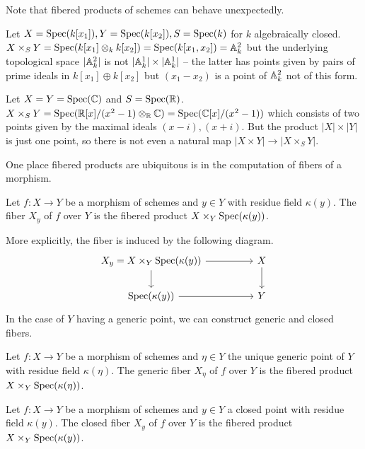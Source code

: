 Note that fibered products of schemes can behave unexpectedly. 
\begin{example}
    Let $X=\operatorname{Spec}(k[x_{1}]),Y=\operatorname{Spec}(k[x_{2}]),S=\operatorname{Spec}(k)$ for $k$ algebraically closed. $X\times_{S}Y=\operatorname{Spec}(k[x_{1}]\otimes_{k}k[x_{2}])=\operatorname{Spec}(k[x_{1},x_{2}])=\mathbb{A}^{2}_{k}$ but the underlying topological space $|\mathbb{A}^{2}_{k}|$ is not $|\mathbb{A}^{1}_{k}|\times|\mathbb{A}^{1}_{k}|$ -- the latter has points given by pairs of prime ideals in $k[x_{1}]\oplus k[x_{2}]$ but $(x_{1}-x_{2})$ is a point of $\mathbb{A}^{2}_{k}$ not of this form. 
\end{example}
\begin{example}
    Let $X=Y=\operatorname{Spec}(\mathbb{C})$ and $S=\operatorname{Spec}(\mathbb{R})$. $X\times_{S}Y=\operatorname{Spec}(\mathbb{R}[x]/(x^{2}-1)\otimes_{\mathbb{R}}\mathbb{C})=\operatorname{Spec}(\mathbb{C}[x]/(x^{2}-1))$ which consists of two points given by the maximal ideals $(x-i),(x+i)$. But the product $|X|\times|Y|$ is just one point, so there is not even a natural map $|X\times Y|\to|X\times_{S}Y|$. 
\end{example}
One place fibered products are ubiquitous is in the computation of fibers of a morphism. 
\begin{definition}[Fiber]\label{def: fiber of morphism}
    Let $f:X\to Y$ be a morphism of schemes and $y\in Y$ with residue field $\kappa(y)$. The fiber $X_{y}$ of $f$ over $Y$ is the fibered product $X\times_{Y}\operatorname{Spec}(\kappa(y))$. 
\end{definition}
More explicitly, the fiber is induced by the following diagram.
$$%
\begin{tikzcd}
	{X_{y}=X\times_{Y}\spec(\kappa(y))} && X \\
	{\spec(\kappa(y))} && Y
	\arrow[from=1-1, to=1-3]
	\arrow[from=1-1, to=2-1]
	\arrow[from=1-3, to=2-3]
	\arrow[from=2-1, to=2-3]
\end{tikzcd}$$
In the case of $Y$ having a generic point, we can construct generic and closed fibers. 
\begin{definition}\label{def: generic fiber}
    Let $f:X\to Y$ be a morphism of schemes and $\eta\in Y$ the unique generic point of $Y$ with residue field $\kappa(\eta)$. The generic fiber $X_{\eta}$ of $f$ over $Y$ is the fibered product $X\times_{Y}\operatorname{Spec}(\kappa(\eta))$.
\end{definition}
\begin{definition}\label{def: closed fiber}
    Let $f:X\to Y$ be a morphism of schemes and $y\in Y$ a closed point with residue field $\kappa(y)$. The closed fiber $X_{y}$ of $f$ over $Y$ is the fibered product $X\times_{Y}\operatorname{Spec}(\kappa(y))$.
\end{definition}
